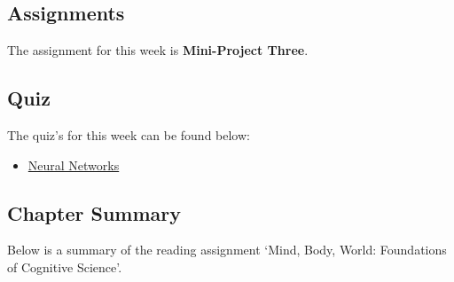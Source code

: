 
\subsection{Assignments}

The assignment for this week is \textbf{Mini-Project Three}.  

\subsection{Quiz}

The quiz's for this week can be found below:

\begin{itemize}
    \item \href{https://applied.cs.colorado.edu/mod/quiz/view.php?id=49399}{Neural Networks}  
\end{itemize}

\subsection{Chapter Summary}

Below is a summary of the reading assignment `Mind, Body, World: Foundations of Cognitive Science'.

